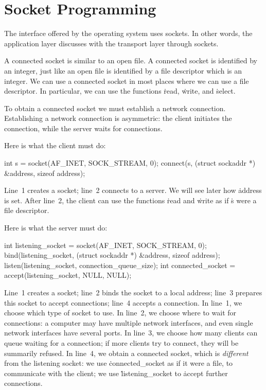 \section*{Socket Programming}

The interface offered by the operating system uses sockets.
In other words,
  the application layer discusses with the transport layer through sockets.

A connected socket is similar to an open file.
A connected socket is identified by an integer,
  just like an open file is identified by a file descriptor which is an integer.
We can use a connected socket in most places where we can use a file descriptor.
In particular, we can use the functions \.{read}, \.{write}, and \.{select}.

To obtain a connected socket we must establish a network connection.
Establishing a network connection is asymmetric:
  the client initiates the connection,
  while the server waits for connections.

Here is what the client must do:
\begin{ccode}
int s = socket(AF_INET, SOCK_STREAM, 0);
connect(s, (struct sockaddr *) &address, sizeof address);
\end{ccode}
Line~1 creates a socket; line~2 connects to a server.
We will see later how \.{address} is set.
After line~2, the client can use the functions \.{read} and \.{write}
  as if \.{s} were a file descriptor.

Here is what the server must do:
\begin{ccode}
int listening_socket = socket(AF_INET, SOCK_STREAM, 0);
bind(listening_socket, (struct sockaddr *) &address, sizeof address);
listen(listening_socket, connection_queue_size);
int connected_socket = accept(listening_socket, NULL, NULL);
\end{ccode}
Line~1 creates a socket;
  line~2 binds the socket to a local address;
  line~3 prepares this socket to accept connections;
  line~4 accepts a connection.
In line~1, we choose which type of socket to use.
In line~2, we choose where to wait for connections:
  a computer may have multiple network interfaces,
  and even single network interfaces have several ports.
In line~3, we choose how many clients can queue waiting for a connection;
  if more clients try to connect, they will be summarily refused.
In line~4, we obtain a connected socket,
  which is \emph{different} from the listening socket:
  we use \.{connected\_socket} as if it were a file, to communicate with the client;
  we use \.{listening\_socket} to \.{accept} further connections.

